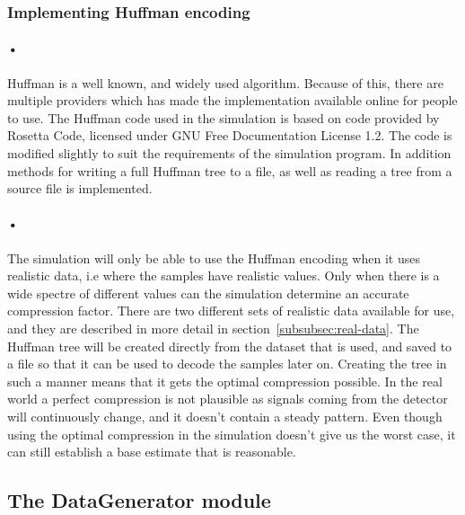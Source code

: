 \documentclass[a4paper, 12pt]{report}
\begin{document}
\begin{minipage}{\linewidth}

\end{minipage}

\subsubsection{Implementing Huffman encoding}

\paragraph{•}
Huffman is a well known, and widely used algorithm.
Because of this, there are multiple providers which has made the implementation available online for people to use.
The Huffman code used in the simulation is based on code provided by Rosetta Code, licensed under GNU Free Documentation License 1.2\cite{rosetta}\cite{gnu}.
The code is modified slightly to suit the requirements of the simulation program.
In addition methods for writing a full Huffman tree to a file, as well as reading a tree from a source file is implemented.

\paragraph{•}
The simulation will only be able to use the Huffman encoding when it uses realistic data, i.e where the samples have realistic values.
Only when there is a wide spectre of different values can the simulation determine an accurate compression factor.
There are two different sets of realistic data available for use, and they are described in more detail in section~\ref{subsubsec:real-data}.
The Huffman tree will be created directly from the dataset that is used, and saved to a file so that it can be used to decode the samples later on.
Creating the tree in such a manner means that it gets the optimal compression possible.
In the real world a perfect compression is not plausible as signals coming from the detector will continuously change, and it doesn't contain a steady pattern.
Even though using the optimal compression in the simulation doesn't give us the worst case, it can still establish a base estimate that is reasonable.

\subsection{The DataGenerator module}
\end{document}

